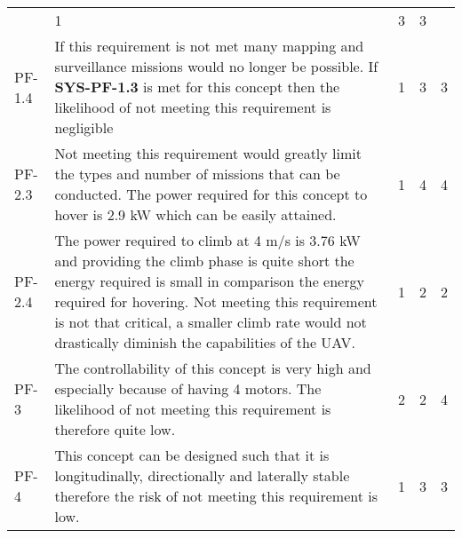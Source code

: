 \begin{table}[]
\begin{tabularx}{\textwidth}{l L l l l}
                & 1 & 3 & 3
        \\ \hdashline
        PF-1.4          & If this requirement is not met many mapping and surveillance missions would no longer be possible. If \textbf{SYS-PF-1.3} is met for this concept then the likelihood of not meeting this requirement is negligible                                                          & 1 & 3 & 3
        \\ \hdashline
        PF-2.3          & Not meeting this requirement would greatly limit the types and number of missions that can be conducted. The power required for this concept to hover is 2.9 kW which can be easily attained.  & 1 & 4 & 4
        \\ \hdashline
        PF-2.4           & The power required to climb at 4 m/s is 3.76 kW and providing the climb phase is quite short the energy required is small in comparison the energy required for hovering. Not meeting this requirement is not that critical, a smaller climb rate would not drastically diminish the capabilities of the UAV.                                                                                                                             & 1 & 2 & 2 
        \\ \hdashline
        PF-3            & The controllability of this concept is very high and especially because of having 4 motors. The likelihood of not meeting this requirement is therefore quite low.    & 2 & 2 & 4
        \\ \hdashline        
        PF-4            & This concept can be designed such that it is longitudinally, directionally and laterally stable therefore the risk of not meeting this requirement is low.         & 1 & 3 & 3
        \\ \bottomrule
    \end{tabularx}
\end{table}




